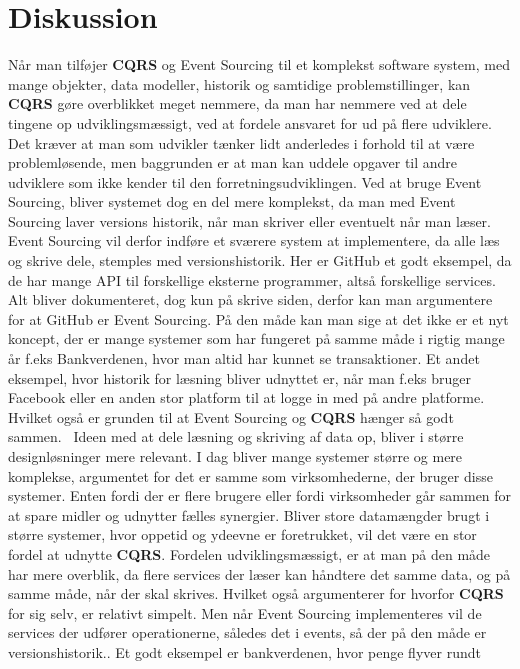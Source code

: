 \chapter{Diskussion}
Når man tilføjer \textbf{CQRS} og Event Sourcing til et komplekst software system, med mange objekter, data modeller, historik og samtidige problemstillinger, kan \textbf{CQRS} gøre overblikket meget nemmere, da man har nemmere ved at dele tingene op udviklingsmæssigt, ved at fordele ansvaret for ud på flere udviklere.
Det kræver at man som udvikler tænker lidt anderledes i forhold til at være problemløsende, men baggrunden er at man kan uddele opgaver til andre udviklere som ikke kender til den forretningsudviklingen.
Ved at bruge Event Sourcing, bliver systemet dog en del mere komplekst, da man med Event Sourcing laver versions historik, når man skriver eller eventuelt når man læser. Event Sourcing vil derfor indføre et sværere system at implementere, da alle læs og skrive dele, stemples med versionshistorik. Her er GitHub et godt eksempel, da de har mange API til forskellige eksterne programmer, altså forskellige services. Alt bliver dokumenteret, dog kun på skrive siden, derfor kan man argumentere for at GitHub er Event Sourcing.
På den måde kan man sige at det ikke er et nyt koncept, der er mange systemer som har fungeret på samme måde i rigtig mange år f.eks Bankverdenen, hvor man altid har kunnet se transaktioner. Et andet eksempel, hvor historik for læsning bliver udnyttet er, når man f.eks bruger Facebook eller en anden stor platform til at logge in med på andre platforme.
Hvilket også er grunden til at Event Sourcing og \textbf{CQRS} hænger så godt sammen.
\
Ideen med at dele læsning og skriving af data op, bliver i større designløsninger mere relevant. 
I dag bliver mange systemer større og mere komplekse, argumentet for det er samme som virksomhederne, der bruger disse systemer. Enten fordi der er flere brugere eller fordi virksomheder går sammen for at spare midler og udnytter fælles synergier.
Bliver store datamængder brugt i større systemer, hvor oppetid og ydeevne er foretrukket, vil det være en stor fordel at udnytte \textbf{CQRS}. Fordelen udviklingsmæssigt, er at man på den måde har mere overblik, da flere services der læser kan håndtere det samme data, og på samme måde, når der skal skrives. Hvilket også argumenterer for hvorfor \textbf{CQRS} for sig selv, er relativt simpelt. Men når Event Sourcing implementeres vil de services der udfører operationerne, således det i events, så der på den måde er versionshistorik.. Et godt eksempel er bankverdenen, hvor penge flyver rundt
